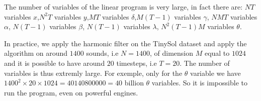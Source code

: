 \documentclass[a4paper]{book}
\begin{document}
   
   


    


  
   

    
    
The number of variables of the linear program is very large, in fact there are: $NT$ variables $x$,$N^2T$ variables $y$,$MT$ variables $\delta$,$M(T-1)$ variables $\gamma$, $NMT$ variables $\alpha$, $N(T-1)$ variables $\beta$, $N(T-1)$ variables $\lambda$, $N^2(T-1)M$ variables $\theta$.

In practice, we apply the harmonic filter on the TinySol dataset and apply the algorithm on around $1400$ sounds, i.e $N=1400$, of dimension $M$ equal to $1024$ and it is possible to have around $20$ timesteps, i.e $T=20$. The number of variables is thus extremly large. For exemple, only for the $\theta$ variable we have $1400^2 \times 20 \times 1024 = 40140800000 = 40$ billion $\theta$ variables. So it is impossible to run the program, even on powerful engines.  
\end{document}
